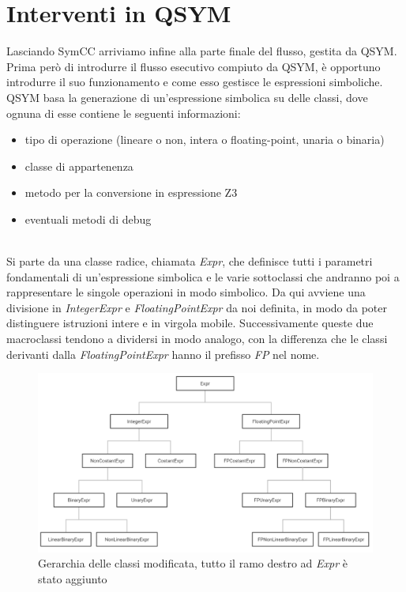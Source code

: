 \documentclass[Lau, oneside]{sapthesis}%
\begin{document}
\newpage
\section{Interventi in QSYM}
Lasciando SymCC arriviamo infine alla parte finale del flusso, gestita da QSYM.
\newline 
Prima però di introdurre il flusso esecutivo compiuto da QSYM, è opportuno introdurre il suo funzionamento e come esso gestisce le espressioni simboliche.
\newline \newline
QSYM basa la generazione di un'espressione simbolica su delle classi, dove ognuna di esse contiene le seguenti informazioni:
\begin{itemize}
    \item tipo di operazione (lineare o non, intera o floating-point, unaria o binaria)
    \item classe di appartenenza
    \item metodo per la conversione in espressione Z3
    \item eventuali metodi di debug
\end{itemize}
\ \\
Si parte da una classe radice, chiamata \textit{Expr}, che definisce tutti i parametri fondamentali di un'espressione simbolica e le varie sottoclassi che andranno poi a rappresentare le singole operazioni in modo simbolico.
\newline
Da qui avviene una divisione in \textit{IntegerExpr} e \textit{FloatingPointExpr} da noi definita, in modo da poter distinguere istruzioni intere e in virgola mobile.
\newline
Successivamente queste due macroclassi tendono a dividersi in modo analogo, con la differenza che le classi derivanti dalla \textit{FloatingPointExpr} hanno il prefisso \textit{FP} nel nome.
\newline
\begin{figure}[h]
    \centering
    \hspace*{-0.95in}
    \includegraphics[scale=0.28]{foto/gerarchia.png}
    \caption{Gerarchia delle classi modificata, tutto il ramo destro ad \textit{Expr} è stato aggiunto}
    \label{fig:gerarchia}
\end{figure}
\end{document}
